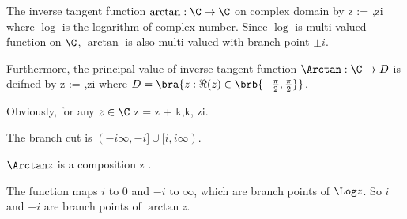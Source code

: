 \begin{definition}\label{def:inverse_tangent_function_complex}
The inverse tangent function $\arctan:\C\to \C$ on complex domain by
\be
\arctan z := \log{},\qquad z\neq\pm i
\ee
where $\log$ is the logarithm of complex number. Since $\log$ is multi-valued function on $\C$, $\arctan$ is also multi-valued with branch point $\pm i$.

Furthermore, the principal value of inverse tangent function $\Arctan:\C\to D$ is deifned by
\be
\Arctan z := \Log{},\qquad z\neq\pm i
\ee
where $D = \bra{z: \Re(z) \in \brb{-\frac{\pi}2,\frac{\pi}2}}$.

Obviously, for any $z\in \C$
\be
\arctan z = \Arctan z + k\pi ,\qquad  k\in \Z, \qquad z\neq \pm i.
\ee

The branch cut is $(-i \infty,-i]\cup [i,i\infty)$.  %
\end{definition}

\begin{remark}
$\Arctan z$ is a composition
\be
z \mapsto {} \mapsto {} \Log{}.
\ee

The function maps $i$ to 0 and $-i$ to $\infty$, which are branch points of $\Log z$. So $i$ and $-i$ are branch points of $\arctan z$.
\end{remark}

